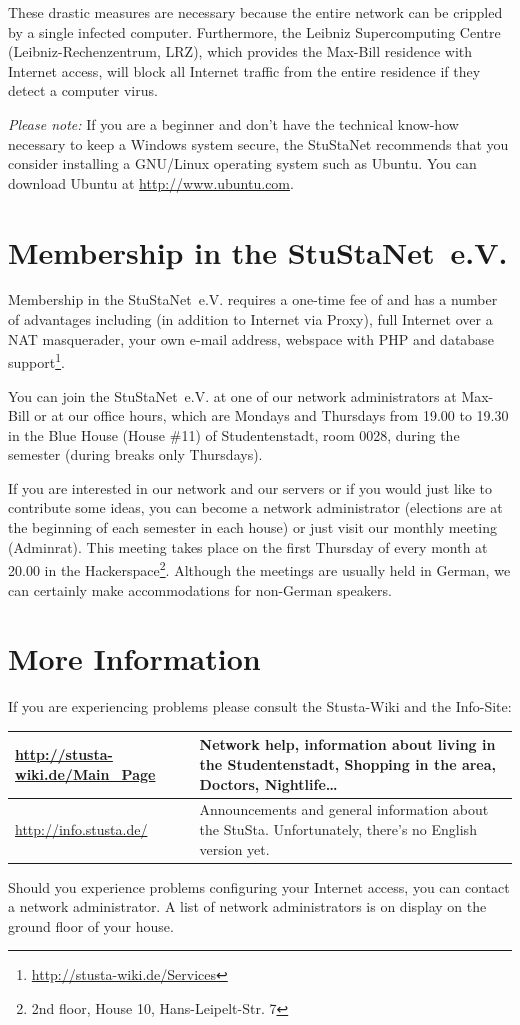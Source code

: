 \documentclass[a4paper,12pt]{scrartcl}
\begin{document}
These drastic measures are necessary because the entire network can be crippled by a single infected computer. Furthermore, the Leibniz Supercomputing Centre (Leibniz-Rechenzentrum, LRZ), which provides the Max-Bill residence with Internet access, will block all Internet traffic from the entire residence if they detect a computer virus.

\emph{Please note:} If you are a beginner and don't have the technical know-how necessary to keep a Windows system secure, the StuStaNet recommends that you consider installing a GNU/Linux operating system such as Ubuntu. You can download Ubuntu at \url{http://www.ubuntu.com}.


\section*{Membership in the StuStaNet~e.V.}

Membership in the StuStaNet~e.V. requires a one-time fee of  and has a number of advantages including (in addition to Internet via Proxy), full Internet over a NAT masquerader, your own e-mail address, webspace with PHP and database support\footnote{\url{http://stusta-wiki.de/Services}}.

You can join the StuStaNet~e.V. at one of our network administrators at Max-Bill or at our office hours, which are Mondays and Thursdays from 19.00 to 19.30 in the Blue House (House \#11) of Studentenstadt, room 0028, during the semester (during breaks only Thursdays).

If you are interested in our network and our servers or if you would just like to contribute some ideas, you can become a network administrator (elections are at the beginning of each semester in each house) or just visit our monthly meeting (Adminrat). This meeting takes place on the first Thursday of every month at 20.00 in the Hackerspace\footnote{2nd floor, House 10, Hans-Leipelt-Str. 7}. Although the meetings are usually held in German, we can certainly make accommodations for non-German speakers.

\section*{More Information}

If you are experiencing problems please consult the Stusta-Wiki and the Info-Site:

\begin{center}
  \begin{tabularx}{\linewidth}{|lX|}
    \hline
    \url{http://stusta-wiki.de/Main_Page} & Network help, information about living in the Studentenstadt, Shopping in the area, Doctors, Nightlife\dots\\
    \hline
    \url{http://info.stusta.de/} & Announcements and general information about the StuSta. Unfortunately, there's no English version yet.\\
    \hline
  \end{tabularx}
\end{center}
Should you experience problems configuring your Internet access, you can contact a network administrator. A list of network administrators is on display on the ground floor of your house.
\end{document}
